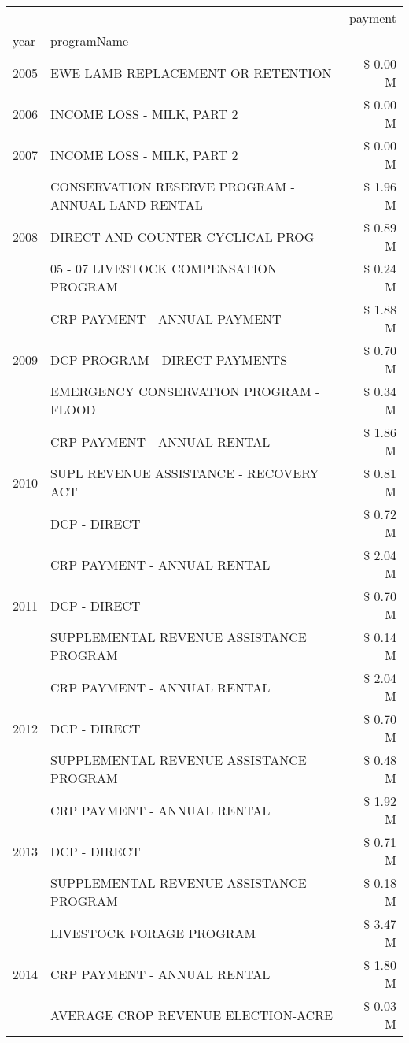 \begin{tabular}{llr}
\toprule
 &  & payment \\
year & programName &  \\
\midrule
2005 & EWE LAMB REPLACEMENT OR RETENTION & \$ 0.00 M \\
\cline{1-3}
2006 & INCOME LOSS - MILK, PART 2 & \$ 0.00 M \\
\cline{1-3}
2007 & INCOME LOSS - MILK, PART 2 & \$ 0.00 M \\
\cline{1-3}
\multirow[t]{3}{*}{2008} & CONSERVATION RESERVE PROGRAM - ANNUAL LAND RENTAL & \$ 1.96 M \\
 & DIRECT AND COUNTER CYCLICAL PROG & \$ 0.89 M \\
 & 05 - 07 LIVESTOCK COMPENSATION PROGRAM & \$ 0.24 M \\
\cline{1-3}
\multirow[t]{3}{*}{2009} & CRP PAYMENT - ANNUAL PAYMENT & \$ 1.88 M \\
 & DCP PROGRAM - DIRECT PAYMENTS & \$ 0.70 M \\
 & EMERGENCY CONSERVATION PROGRAM - FLOOD & \$ 0.34 M \\
\cline{1-3}
\multirow[t]{3}{*}{2010} & CRP PAYMENT - ANNUAL RENTAL & \$ 1.86 M \\
 & SUPL REVENUE ASSISTANCE - RECOVERY ACT & \$ 0.81 M \\
 & DCP - DIRECT & \$ 0.72 M \\
\cline{1-3}
\multirow[t]{3}{*}{2011} & CRP PAYMENT - ANNUAL RENTAL & \$ 2.04 M \\
 & DCP - DIRECT & \$ 0.70 M \\
 & SUPPLEMENTAL REVENUE ASSISTANCE PROGRAM & \$ 0.14 M \\
\cline{1-3}
\multirow[t]{3}{*}{2012} & CRP PAYMENT - ANNUAL RENTAL & \$ 2.04 M \\
 & DCP - DIRECT & \$ 0.70 M \\
 & SUPPLEMENTAL REVENUE ASSISTANCE PROGRAM & \$ 0.48 M \\
\cline{1-3}
\multirow[t]{3}{*}{2013} & CRP PAYMENT - ANNUAL RENTAL & \$ 1.92 M \\
 & DCP - DIRECT & \$ 0.71 M \\
 & SUPPLEMENTAL REVENUE ASSISTANCE PROGRAM & \$ 0.18 M \\
\cline{1-3}
\multirow[t]{3}{*}{2014} & LIVESTOCK FORAGE PROGRAM & \$ 3.47 M \\
 & CRP PAYMENT - ANNUAL RENTAL & \$ 1.80 M \\
 & AVERAGE CROP REVENUE ELECTION-ACRE & \$ 0.03 M \\

\end{tabular}
